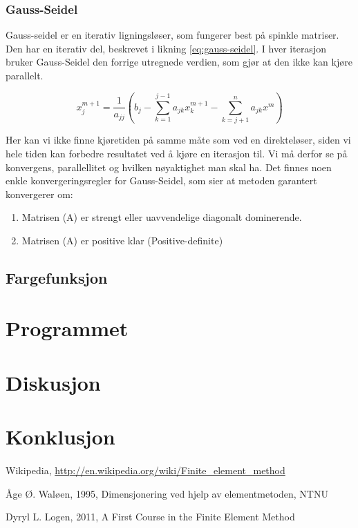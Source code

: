 \documentclass[10pt,a4paper, norsk]{article}
\begin{document}
\subsubsection*{Gauss-Seidel}
Gauss-seidel er en iterativ ligningsløser, som fungerer best på spinkle matriser. Den har en iterativ del, beskrevet i likning \ref{eq:gauss-seidel}. I hver iterasjon bruker Gauss-Seidel  den forrige utregnede verdien, som gjør at den ikke kan kjøre parallelt. 
 
 \begin{equation} \label{seideliterater}
   x_j^{m+1} = \frac{1}{a_{jj}}  (b_j - \sum_{k=1}^{j-1} a_{jk} x_k^{m+1} - \sum_{k=j+1}^n a_{jk}x^m)
 \end{equation}

Her kan vi ikke finne kjøretiden på samme måte som ved en direkteløser, siden vi hele tiden kan forbedre resultatet ved å kjøre en iterasjon til. Vi må derfor se på konvergens, parallellitet og hvilken nøyaktighet man skal ha. Det finnes noen enkle konvergeringsregler for Gauss-Seidel, som sier at metoden garantert konvergerer om:
\begin{enumerate}
\item Matrisen (A) er strengt eller uavvendelige diagonalt dominerende.
\item Matrisen (A) er positive klar (Positive-definite)
\end{enumerate}




\subsection*{Fargefunksjon}





\section*{Programmet} 


\section*{Diskusjon}


\section*{Konklusjon}

\paragraph{} 


\begin{thebibliography}{9}

  Wikipedia,
  \url{http://en.wikipedia.org/wiki/Finite_element_method}
  

  Åge Ø. Waløen,
  1995, 
  Dimensjonering ved hjelp av elementmetoden, NTNU
 
	Dyryl L. Logen, 2011, A First Course in the Finite Element Method


\end{thebibliography}
\end{document}
